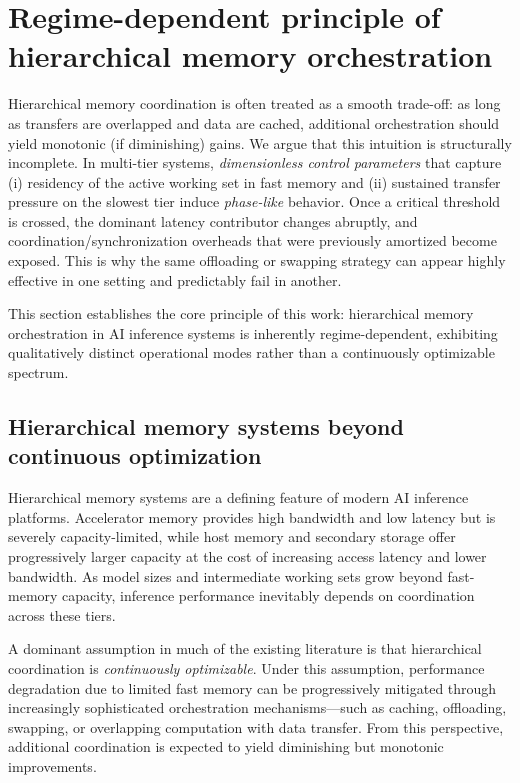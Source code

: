 \section{Regime-dependent principle of hierarchical memory orchestration}
\label{sec:regime}

Hierarchical memory coordination is often treated as a smooth trade-off: as long as transfers are overlapped and data are cached, additional orchestration should yield monotonic (if diminishing) gains. We argue that this intuition is structurally incomplete. In multi-tier systems, \emph{dimensionless control parameters} that capture (i) residency of the active working set in fast memory and (ii) sustained transfer pressure on the slowest tier induce \emph{phase-like} behavior. Once a critical threshold is crossed, the dominant latency contributor changes abruptly, and coordination/synchronization overheads that were previously amortized become exposed. This is why the same offloading or swapping strategy can appear highly effective in one setting and predictably fail in another.

This section establishes the core principle of this work: hierarchical memory orchestration in AI inference systems is inherently regime-dependent, exhibiting qualitatively distinct operational modes rather than a continuously optimizable spectrum.


\subsection{Hierarchical memory systems beyond continuous optimization}
Hierarchical memory systems are a defining feature of modern AI inference platforms. Accelerator memory provides high bandwidth and low latency but is severely capacity-limited, while host memory and secondary storage offer progressively larger capacity at the cost of increasing access latency and lower bandwidth. As model sizes and intermediate working sets grow beyond fast-memory capacity, inference performance inevitably depends on coordination across these tiers.

A dominant assumption in much of the existing literature is that hierarchical coordination is \emph{continuously optimizable}. Under this assumption, performance degradation due to limited fast memory can be progressively mitigated through increasingly sophisticated orchestration mechanisms---such as caching, offloading, swapping, or overlapping computation with data transfer. From this perspective, additional coordination is expected to yield diminishing but monotonic improvements.


